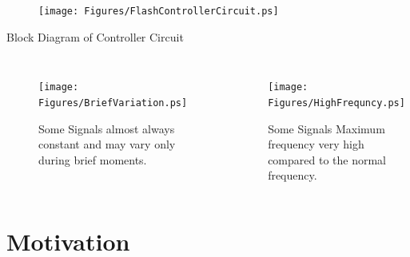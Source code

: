 \begin{figure}
			\texttt{[image: Figures/FlashControllerCircuit.ps]}\\
		\end{figure}
		\small{Block Diagram of Controller Circuit}



		\begin{columns}[c]
		\column{2.5in}
			\begin{figure}
				\begin{center}
					\texttt{[image: Figures/BriefVariation.ps]}\\
               				\caption{Some Signals almost always constant and may vary only during brief moments.}
				\end{center}
			\end{figure}
		\column{2.5in}
			\begin{figure}
				\begin{center}
					\texttt{[image: Figures/HighFrequncy.ps]}\\
               				\caption{Some Signals Maximum frequency very high compared to the normal frequency.}
				\end{center}
			\end{figure}
		\end{columns}







\section{Motivation}
